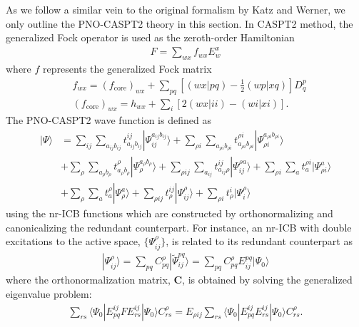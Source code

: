 \documentclass[aip,jcp,amsmath]{revtex4-1}
\begin{document}
%
As we follow a similar vein to the original formalism by Katz and Werner,\cite{:/content/aip/journal/jcp/145/12/10.1063/1.4963019,doi:10.1063/1.5097644} we only outline the PNO-CASPT2 theory in this section.
%
In CASPT2 method, the generalized Fock operator is used as the zeroth-order Hamiltonian
%
\begin{align}
  F=\sum_{wx} f_{wx} E^x_w
\end{align}
%
where $f$ represents the generalized Fock matrix
%
\begin{align}
  &f_{wx} = (f_\text{core})_{wx} + \sum_{pq} \left[(wx|pq)-\frac{1}{2}(wp|xq)\right]D^p_q \\
  &(f_\text{core})_{wx} = h_{wx} + \sum_{i} [2(wx|ii)-(wi|xi)]. 
\end{align}
%
The PNO-CASPT2 wave function is defined as
%
\begin{align}
  |\Psi\rangle&=\sum_{ij}\sum_{a_{ij}b_{ij}} t_{a_{ij}b_{ij}}^{ij}|\Psi_{ij}^{a_{ij}b_{ij}}\rangle+\sum_{\rho i}\sum_{a_{\rho i}b_{\rho i}} t_{a_{\rho i}b_{\rho i}}^{\rho i}|\Psi_{{\rho i}}^{a_{\rho i}b_{\rho i}}\rangle \nonumber \\
  &+\sum_{\rho}\sum_{a_{\rho}b_{\rho}} t_{a_{\rho}b_{\rho}}^{\rho}|\Psi_{{\rho}}^{a_{\rho}b_{\rho}}\rangle + \sum_{\rho ij}\sum_{a_{ij}} t_{a_{ij}\rho}^{ij}|\Psi_{ij}^{\rho a}\rangle +\sum_{\rho i}\sum_a t_{a}^{\rho i}|\Psi_{\rho i}^{a}\rangle \nonumber \\
  &+\sum_{\rho}\sum_a t_{a}^\rho|\Psi_\rho^a\rangle + \sum_{\rho ij} t_{\rho}^{ij}|\Psi_{ij}^\rho\rangle+\sum_{\rho i} t_{\rho}^i|\Psi_{i}^\rho\rangle \label{eq:pno-caspt2}
\end{align}
%
using the nr-ICB functions which are constructed by orthonormalizing and canonicalizing the redundant counterpart.
%
For instance, an nr-ICB with double excitations to the active space, $\{\Psi^{\rho}_{ij}\}$, is related to its redundant counterpart as
%
\begin{align}
  |\Psi_{ij}^{\rho}\rangle=\sum_{pq} C_{pq}^{\rho} |\tilde{\Psi}_{ij}^{pq}\rangle = \sum_{pq} C_{pq}^{\rho} E_{ij}^{pq} |\Psi_0\rangle
\end{align}
%
where the orthonormalization matrix, $\mathbf{C}$, is obtained by solving the generalized eigenvalue problem:
%
\begin{align}
  \sum_{rs}\langle\Psi_0|E_{pq}^{ij}FE_{rs}^{ij}|\Psi_0\rangle C_{rs}^\rho=E_{\rho ij}\sum_{rs}\langle\Psi_0|E_{pq}^{ij}E_{rs}^{ij}|\Psi_0\rangle C_{rs}^\rho. \label{eq:eigen-Vp2}
\end{align}
\end{document}
